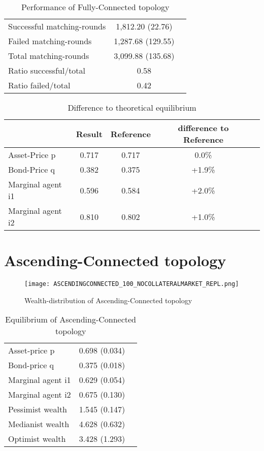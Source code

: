 \documentclass[Bachelorarbeit.tex]{subfiles}
\begin{document}
\begin{table}[H]
	\caption{Performance of Fully-Connected topology}
	\centering
	\begin{tabular} { l c r }
		\hline
		Successful matching-rounds & 1,812.20 (22.76) \\
		Failed matching-rounds & 1,287.68 (129.55) \\
		Total matching-rounds & 3,099.88 (135.68) \\
		\hline
		Ratio successful/total & 0.58 \\
		Ratio failed/total & 0.42 \\
		\hline
	\end{tabular}
\end{table}

\begin{table}[H]
	\caption{Difference to theoretical equilibrium}
	\centering
	\begin{tabular} { l c c c r }
		& Result & Reference & difference to Reference \\
		\hline
		Asset-Price p & 0.717 & 0.717 & 0.0\% \\
		Bond-Price q & 0.382 & 0.375 & +1.9\% \\
		Marginal agent i1 & 0.596  & 0.584 & +2.0\% \\
		Marginal agent i2 & 0.810 & 0.802 & +1.0\% \\
		\hline
	\end{tabular}
\end{table}

\section{Ascending-Connected topology} 

\begin{figure}[H]
	\centering
  \texttt{[image: ASCENDINGCONNECTED\_100\_NOCOLLATERALMARKET\_REPL.png]}
	\caption{Wealth-distribution of Ascending-Connected topology}
	\label{fig:wealth_ASCENDINGCONNECTED_100_NOCOLLATERALMARKET_REPL}
\end{figure}

\begin{table}[H]
	\caption{Equilibrium of Ascending-Connected topology}
	\centering
	\begin{tabular} { l c r }
		\hline
		Asset-price p & 0.698 (0.034) \\
		Bond-price q & 0.375 (0.018) \\
		Marginal agent i1 & 0.629 (0.054) \\
		Marginal agent i2 & 0.675 (0.130) \\
		\hline
		Pessimist wealth & 1.545 (0.147) \\
		Medianist wealth & 4.628 (0.632) \\
		Optimist wealth & 3.428 (1.293) \\
		\hline
	\end{tabular}
	\label{tab:ascendingconnected_equilibrium_100Agents_05Bond}
\end{table} 
\end{document}
